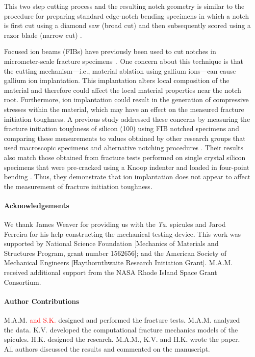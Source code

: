 \documentclass[12pt,onecolumn]{article}
\makeatletter
\newcommand{\TA}{\textit{Ta.\@}\xspace}
\makeatother
\begin{document}
\begin{bibunit}
This two step cutting process and the resulting notch geometry is similar to the procedure for preparing standard edge-notch bending specimens in which a notch is first cut using a diamond saw (broad cut) and then subsequently scored using a razor blade (narrow cut) \cite{rocha2006effect,kubler1997fracture,damani1996critical}.

Focused ion beams (FIBs) have previously been used to cut notches in micrometer-scale fracture specimens~\cite{jaya2015can,fett2008fracture,ochiai2014fracture,morishita2006fracture}.  One concern about this technique is that the cutting mechanism---i.e., material ablation using gallium ions---can cause gallium ion implantation. This implantation alters local composition of the material and therefore could affect the local material properties near the notch root. Furthermore, ion implantation could result in the generation of compressive stresses within the material, which may have an effect on the measured fracture initiation toughness. A previous study \cite{jaya2015can} addressed these concerns by measuring the fracture initiation toughness of silicon (100) using FIB notched specimens and comparing these measurements to values obtained by other research groups that used macroscopic specimens and alternative notching procedures \cite{ritchie2003failure}. Their results also match those obtained from fracture tests performed on single crystal silicon specimens that were pre-cracked using a Knoop indenter and loaded in four-point bending \cite{chen1980fracture}. Thus, they demonstrate that ion implantation does not appear to affect the measurement of fracture initiation toughness.

\singlespacing

\paragraph{Acknowledgements} %

We thank James Weaver for providing us with the \TA spicules and Jarod Ferreira for his help constructing the mechanical testing device. This work was supported by National Science Foundation [Mechanics of Materials and Structures Program, grant number 1562656]; and the American Society of Mechanical Engineers [Haythornthwaite Research Initiation Grant]. M.A.M. received additional support from the NASA Rhode Island Space Grant Consortium.

\paragraph{Author Contributions} M.A.M. \textcolor{red}{and S.K.} designed and performed the fracture tests. M.A.M. analyzed the data. K.V. developed the computational fracture mechanics models of the spicules. H.K. designed the research. M.A.M., K.V. and H.K. wrote the paper. All authors discussed the results and commented on the manuscript.


\end{bibunit}
\end{document}
